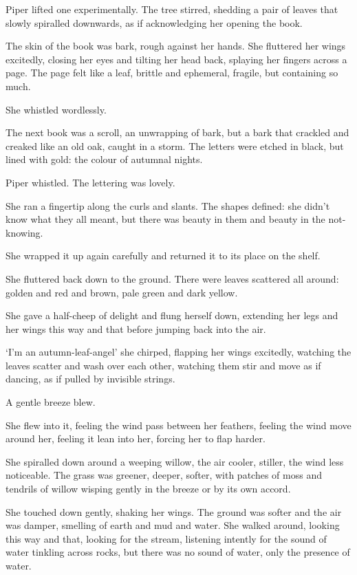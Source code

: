 Piper lifted one experimentally. The tree stirred, shedding a pair of
leaves that slowly spiralled downwards, as if acknowledging her
opening the book.

The skin of the book was bark, rough against her hands. She fluttered
her wings excitedly, closing her eyes and tilting her head back,
splaying her fingers across a page. The page felt like a leaf, brittle
and ephemeral, fragile, but containing so much.

She whistled wordlessly.

The next book was a scroll, an unwrapping of bark, but a bark that
crackled and creaked like an old oak, caught in a storm. The letters
were etched in black, but lined with gold: the colour of autumnal
nights.

Piper whistled. The lettering was lovely.

She ran a fingertip along the curls and slants. The shapes defined:
she didn't know what they all meant, but there was beauty in them and
beauty in the not-knowing.

She wrapped it up again carefully and returned it to its place on the shelf.

She fluttered back down to the ground. There were leaves scattered all
around: golden and red and brown, pale green and dark yellow.

She gave a half-cheep of delight and flung herself down, extending her
legs and her wings this way and that before jumping back into the air.

`I'm an autumn-leaf-angel' she chirped, flapping her wings excitedly,
watching the leaves scatter and wash over each other, watching them
stir and move as if dancing, as if pulled by invisible strings.

A gentle breeze blew.

She flew into it, feeling the wind pass between her feathers, feeling
the wind move around her, feeling it lean into her, forcing her to
flap harder.

She spiralled down around a weeping willow, the air cooler, stiller,
the wind less noticeable. The grass was greener, deeper, softer, with
patches of moss and tendrils of willow wisping gently in the breeze or
by its own accord.

She touched down gently, shaking her wings. The ground was softer and
the air was damper, smelling of earth and mud and water. She walked
around, looking this way and that, looking for the stream, listening
intently for the sound of water tinkling across rocks, but there was
no sound of water, only the presence of water. %

